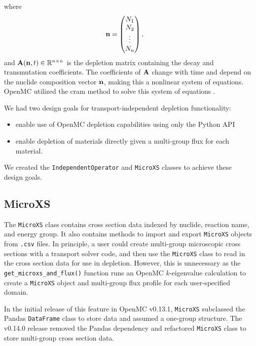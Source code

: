     where
    \begin{equation}
      \mathbf{n} = \begin{pmatrix} N_1 \\ N_2 \\ \vdots \\ N_n \end{pmatrix}, \quad
    \end{equation}
    and $\mathbf{A}(\mathbf{n},t) \in \mathbb{R}^{n\times n}$ is the depletion
    matrix containing the decay and transmutation coefficients. The coefficients
    of $\mathbf{A}$ change with time and depend on the nuclide
    composition vector $\mathbf{n}$, making this a nonlinear system of equations.
    OpenMC utilized the \Gls{cram} method to solve this system of equations
    \citep{romano_depletion_2021}. 
    
    We had two design goals for
    transport-independent depletion functionality:
    \begin{itemize}
        \item enable use of OpenMC depletion capabilities using only the Python API
        \item enable depletion of materials directly given a multi-group flux
            for each material.
    \end{itemize}
    
    We created the \verb.IndependentOperator. and \verb.MicroXS. classes to
    achieve these design goals.    
    \subsection{MicroXS}
        \label{sub:microxs}
        The \verb.MicroXS. class contains cross section data indexed by nuclide,
        reaction name, and energy group. It also contains methods to import and
        export \verb.MicroXS. objects from \verb,.csv, files. In principle, a
        user could create multi-group microscopic cross sections with a
        transport solver code, and then use the \verb.MicroXS.  class to read in
        the cross section data for use in depletion. However, this is
        unnecessary as the \verb.get_microxs_and_flux(). function runs an OpenMC
        $k$-eigenvalue calculation to create a \verb.MicroXS. object and
        multi-group flux profile for each user-specified domain.

        In the initial release of this feature in OpenMC v0.13.1, \verb.MicroXS.
        subclassed the Pandas \verb.DataFrame. class to store data and assumed a
        one-group structure. The v0.14.0 release removed the Pandas dependency
        and refactored \verb.MicroXS. class to store multi-group cross section
        data.

